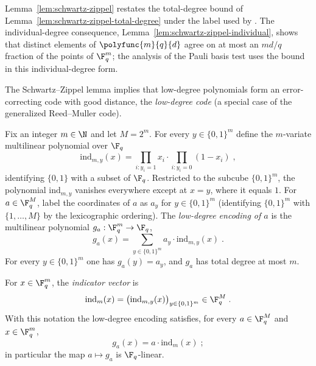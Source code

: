\begin{remark}\label{rem:schwartz-zippel-restated}
	Lemma~\ref{lem:schwartz-zippel} restates the total-degree bound of
	Lemma~\ref{lem:schwartz-zippel-total-degree} under the label used by
	\cite{Ji2020MIPStar}. The individual-degree consequence,
	Lemma~\ref{lem:schwartz-zippel-individual}, shows that distinct elements of
	$\polyfunc{m}{q}{d}$ agree on at most an $md/q$ fraction of the points of
	$\F_q^m$; the analysis of the Pauli basis test uses the bound in this
	individual-degree form.
\end{remark}

The Schwartz--Zippel lemma implies that low-degree polynomials form an
error-correcting code with good distance, the \emph{low-degree code} (a special
case of the generalized Reed--Muller code).

\begin{definition}\label{def:low-degree-encoding}
	\leanok
	Fix an integer $m \in \N$ and let $M = 2^m$. For every $y \in \{0,1\}^m$
	define the $m$-variate multilinear polynomial over $\F_q$
	\[
		\mathrm{ind}_{m,y}(x)
		= \prod_{i : y_i = 1} x_i \cdot \prod_{i : y_i = 0} (1 - x_i)\;,
	\]
	identifying $\{0,1\}$ with a subset of $\F_q$. Restricted to the subcube
	$\{0,1\}^m$, the polynomial $\mathrm{ind}_{m,y}$ vanishes everywhere except
	at $x = y$, where it equals $1$. For $a \in \F_q^M$, label the coordinates
	of $a$ as $a_y$ for $y \in \{0,1\}^m$ (identifying $\{0,1\}^m$ with
	$\{1, \dots, M\}$ by the lexicographic ordering). The \emph{low-degree
	encoding of $a$} is the multilinear polynomial $g_a : \F_q^m \to \F_q$,
	\begin{equation}\label{eq:ld-encoding}
		g_a(x) = \sum_{y \in \{0,1\}^m} a_y \cdot \mathrm{ind}_{m,y}(x)\;.
	\end{equation}
	For every $y \in \{0,1\}^m$ one has $g_a(y) = a_y$, and $g_a$ has total
	degree at most $m$.
\end{definition}

\begin{definition}\label{def:indicator-vector}
	\leanok
	For $x \in \F_q^m$, the \emph{indicator vector} is
	\[
		\mathrm{ind}_m(x)
		= \bigl(\mathrm{ind}_{m,y}(x)\bigr)_{y \in \{0,1\}^m} \in \F_q^M\;.
	\]
	With this notation the low-degree encoding satisfies, for every
	$a \in \F_q^M$ and $x \in \F_q^m$,
	\begin{equation}\label{eq:low-degree-encoding-definition}
		g_a(x) = a \cdot \mathrm{ind}_m(x)\;;
	\end{equation}
	in particular the map $a \mapsto g_a$ is $\F_q$-linear.
\end{definition}

